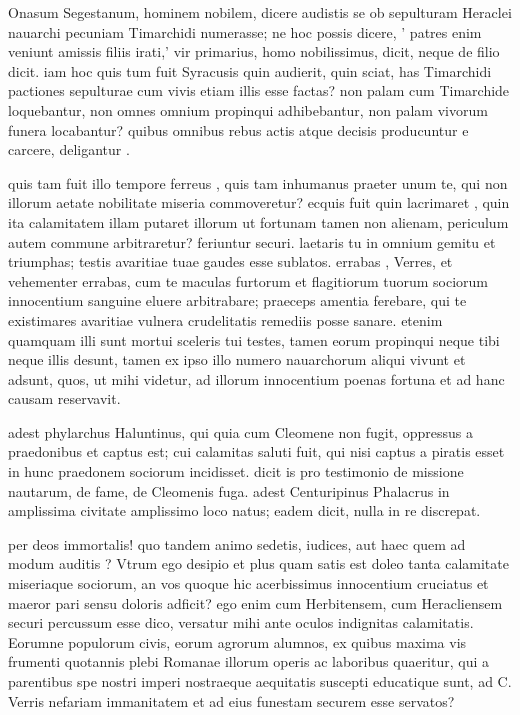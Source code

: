  Onasum Segestanum, hominem nobilem, dicere audistis se ob sepulturam Heraclei nauarchi pecuniam Timarchidi numerasse; ne hoc possis dicere, ' patres enim veniunt amissis filiis irati,' vir primarius, homo nobilissimus, dicit, neque de filio dicit. iam hoc quis tum fuit Syracusis quin audierit, quin sciat, has Timarchidi pactiones sepulturae cum vivis etiam illis esse factas? non palam cum Timarchide loquebantur, non omnes omnium propinqui adhibebantur, non palam vivorum funera locabantur? quibus omnibus rebus actis atque decisis producuntur e carcere, deligantur .

 quis tam fuit illo tempore ferreus , quis tam inhumanus praeter unum te, qui non illorum aetate nobilitate miseria commoveretur? ecquis fuit quin lacrimaret , quin ita calamitatem illam putaret illorum ut fortunam tamen non alienam, periculum autem commune arbitraretur? feriuntur securi. laetaris tu in omnium gemitu et triumphas; testis avaritiae tuae gaudes esse sublatos. errabas , Verres, et vehementer errabas, cum te maculas furtorum et flagitiorum tuorum sociorum innocentium sanguine eluere arbitrabare; praeceps amentia ferebare, qui te existimares avaritiae vulnera crudelitatis remediis posse sanare. etenim quamquam illi sunt mortui sceleris tui testes, tamen eorum propinqui neque tibi neque illis desunt, tamen ex ipso illo numero nauarchorum aliqui vivunt et adsunt, quos, ut mihi videtur, ad illorum innocentium poenas fortuna et ad hanc causam reservavit.

 adest phylarchus Haluntinus, qui quia cum Cleomene non fugit, oppressus a praedonibus et captus est; cui calamitas saluti fuit, qui nisi captus a piratis esset in hunc praedonem sociorum incidisset. dicit is pro testimonio de missione nautarum, de fame, de Cleomenis fuga. adest Centuripinus Phalacrus in amplissima civitate amplissimo loco natus; eadem dicit, nulla in re discrepat.

 per deos immortalis! quo tandem animo sedetis, iudices, aut haec quem ad modum auditis ? Vtrum ego desipio et plus quam satis est doleo tanta calamitate miseriaque sociorum, an vos quoque hic acerbissimus innocentium cruciatus et maeror pari sensu doloris adficit? ego enim cum Herbitensem, cum Heracliensem securi percussum esse dico, versatur mihi ante oculos indignitas calamitatis. Eorumne populorum civis, eorum agrorum alumnos, ex quibus maxima vis frumenti quotannis plebi Romanae illorum operis ac laboribus quaeritur, qui a parentibus spe nostri imperi nostraeque aequitatis suscepti educatique sunt, ad C. Verris nefariam immanitatem et ad eius funestam securem esse servatos?

